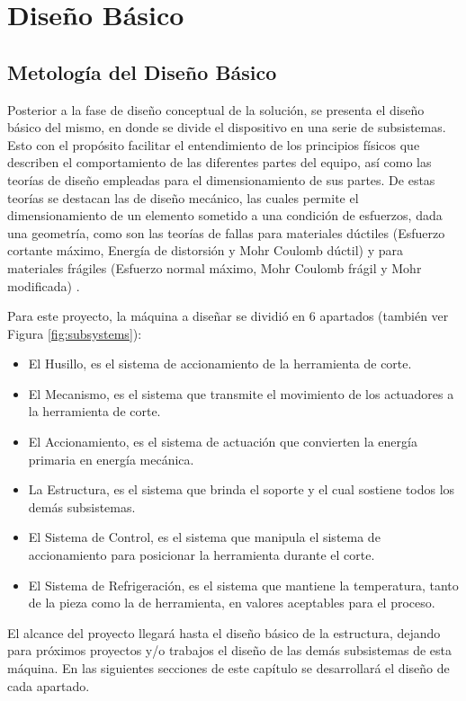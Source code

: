 \chapter{Diseño Básico}

\section{Metología del Diseño Básico}
Posterior a la fase de diseño conceptual de la solución, se presenta el diseño básico del mismo, en donde se divide el dispositivo en una serie de subsistemas. Esto con el propósito facilitar el entendimiento de los principios físicos que describen el comportamiento de las diferentes partes del equipo, así como las teorías de diseño empleadas para el dimensionamiento de sus partes. De estas teorías se destacan las de diseño mecánico, las cuales permite el dimensionamiento de un elemento sometido a una condición de esfuerzos, dada una geometría, como son las teorías de fallas para materiales dúctiles (Esfuerzo cortante máximo, Energía de distorsión y Mohr Coulomb dúctil) y para materiales frágiles (Esfuerzo normal máximo, Mohr Coulomb frágil y Mohr modificada) \citep{shigley2011shigley}.

Para este proyecto, la máquina a diseñar se dividió en 6 apartados (también ver Figura \ref{fig:subsystems}):

\begin{itemize} \nosep
    \item El Husillo, es el sistema de accionamiento de la herramienta de corte.
    \item El Mecanismo, es el sistema que transmite el movimiento de los actuadores a la herramienta de corte.
    \item El Accionamiento, es el sistema de actuación que convierten la energía primaria en energía mecánica.
    \item La Estructura, es el sistema que brinda el soporte y el cual sostiene todos los demás subsistemas.
    \item El Sistema de Control, es el sistema que manipula el sistema de accionamiento para posicionar la herramienta durante el corte.
    \item El Sistema de Refrigeración, es el sistema que mantiene la temperatura, tanto de la pieza como la de herramienta, en valores aceptables para el proceso.
\end{itemize}

El alcance del proyecto llegará hasta el diseño básico de la estructura, dejando para próximos proyectos y/o trabajos el diseño de las demás subsistemas de esta máquina. En las siguientes secciones de este capítulo se desarrollará el diseño de cada apartado.

